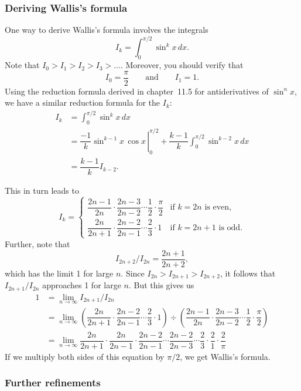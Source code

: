 \subsubsection{Deriving Wallis's formula}
\label{subsubsec:deriving-walliss-formula}
One way to derive Wallis's formula involves the integrals
	\[
I_k = \int_0^{\pi/2}\sin^kx\,dx.
\]
Note that $I_0>I_1>I_2>I_3>\ldots .$  Moreover, you should verify that
	\[
I_0 = \dfrac{\pi}{2} \qquad \mbox{and} \qquad I_1=1.
\] 
Using the reduction formula derived in chapter~11.5 for
antiderivatives of $\sin^n{x}$, we have a similar reduction formula
for the $I_k$:
\begin{align*}
I_k &= \int_0^{\pi/2}\sin^kx\,dx  \\
  &= \left. \dfrac{-1}{k}\sin^{k-1}x\,\cos x \, \right|_0^{\pi/2}
      + \dfrac{k-1}{k} \int_0^{\pi/2} \sin^{k-2}x\,dx \\
  &=  \dfrac{k-1}{k} I_{k-2}.
\end{align*}

This in turn leads to
\[
I_k  = \begin{cases}
\dfrac{2n-1}{2n}\cdot \dfrac{2n-3}{2n-2}\cdots \dfrac{1}{2}\cdot  
    \dfrac{\pi}{2} & \mbox{if $k=2n$ is even}, \\[.15in]
\dfrac{2n}{2n+1}\cdot \dfrac{2n-2}{2n-1}\cdots \dfrac{2}{3}\cdot  1
  & \mbox {if $k=2n+1$ is odd}.
\end{cases}
\]
Further, note that
	\[
I_{2n+2}/I_{2n}= \dfrac{2n+1}{2n+2},
\]
which has the limit 1 for large $n$.  Since
$I_{2n}>I_{2n+1}>I_{2n+2}$, it follows that $I_{2n+1}/I_{2n}$
approaches 1 for large $n$.  But this gives us
\begin{align*}
1 &= {\displaystyle\lim_{n \rightarrow \infty}I_{2n+1}/I_{2n}} \\[4pt]
  &= {\displaystyle  \lim_{n \rightarrow \infty}
    	\left(\dfrac{2n}{2n+1}\cdot \dfrac{2n-2}{2n-1}\cdots 
		\dfrac{2}{3}\cdot  1\right)
	\div 
\left(\dfrac{2n-1}{2n}\cdot \dfrac{2n-3}{2n-2}\cdots \dfrac{1}{2}\cdot 
	\dfrac{\pi}{2}\right)} \\[4pt]
   &= {\displaystyle\lim_{n \rightarrow \infty}
	\dfrac{2n}{2n+1}\cdot \dfrac{2n}{2n-1}\cdot \dfrac{2n-2}{2n-1}\cdots 
	\dfrac{2n-2}{2n-3} \cdots \dfrac{2}{3}\cdot \dfrac{2}{1}\cdot 
	\dfrac{2}{\pi}}
\end{align*}
If we multiply both sides of this equation by $\pi/2$, we get Wallis's formula.

\subsubsection{Further refinements}
\label{subsubsec:further-refinements}

